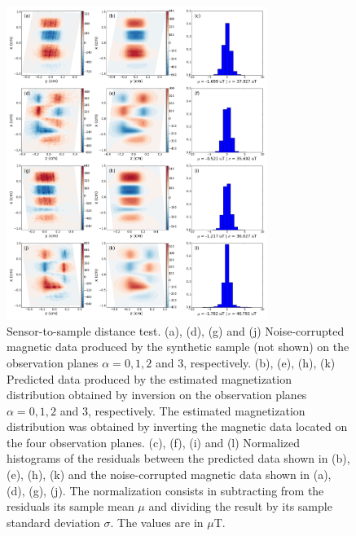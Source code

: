\documentclass[draft,gc]{agutex}
\begin{document}
 \begin{figure}
 \noindent \includegraphics[width=20pc]{Figs/Fig9_LQ.png}
 \caption{Sensor-to-sample distance test. (a), (d), (g) and (j) Noise-corrupted
 magnetic data produced by the synthetic sample (not shown) on the
 observation planes $\alpha = 0, 1, 2$ and $3$, respectively.
 (b), (e), (h), (k) Predicted data produced by the estimated
 magnetization distribution obtained by inversion on the
 observation planes $\alpha = 0, 1, 2$ and $3$, respectively.
 The estimated magnetization distribution was obtained by
 inverting the magnetic data located on the four observation
 planes.
 (c), (f), (i) and (l) Normalized histograms of the residuals between the
 predicted data shown in (b), (e), (h), (k) and the 
 noise-corrupted magnetic data shown in (a), (d), (g), (j). 
 The normalization
 consists in subtracting from the residuals its sample mean $\mu$ 
 and dividing the result by its sample standard deviation $\sigma$.
 The values are in $\mu$T.}
 \label{fig:datafit-sensor2sample}
 \end{figure}
 
\end{document}
